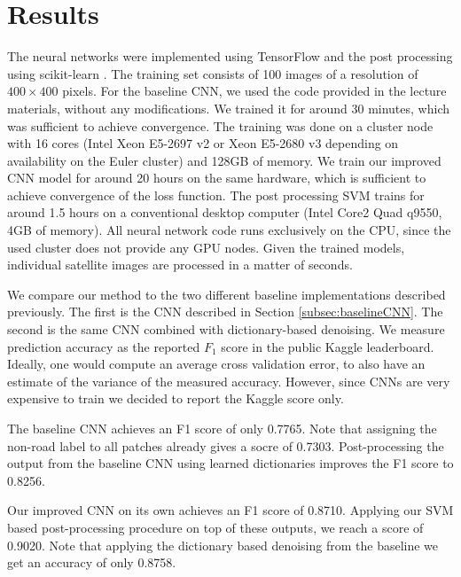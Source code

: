 \documentclass[10pt,conference,compsocconf]{IEEEtran}
\begin{document}
\section{Results}
\label{sec:results}
The neural networks were implemented using TensorFlow \cite{tensorflow.2015} and the post processing using scikit-learn \cite{sklearn.2011}. The training set consists of 100 images of a resolution of $ 400 \times 400 $ pixels. For the baseline CNN, we used the code provided in the lecture materials, without any modifications. We trained it for around 30 minutes, which was sufficient to achieve convergence. The training was done on a cluster node with 16 cores (Intel Xeon E5-2697 v2 or Xeon E5-2680 v3 depending on availability on the Euler cluster) and 128GB of memory. We train our improved CNN model for around 20 hours on the same hardware, which is sufficient to achieve convergence of the loss function. The post processing SVM trains for around 1.5 hours on a conventional desktop computer (Intel Core2 Quad q9550, 4GB of memory). All neural network code runs exclusively on the CPU, since the used cluster does not provide any GPU nodes. Given the trained models, individual satellite images are processed in a matter of seconds.

\par 
We compare our method to the two different baseline implementations described previously. The first is the CNN described in Section \ref{subsec:baselineCNN}. The second is the same CNN combined with dictionary-based denoising. We measure prediction accuracy as the reported $ F_1 $ score in the public Kaggle leaderboard. Ideally, one would compute an average cross validation error, to also have an estimate of the variance of the measured accuracy. However, since CNNs are very expensive to train we decided to report the Kaggle score only.

\par
The baseline CNN achieves an F1 score of only 0.7765. Note that assigning the non-road label to all patches already gives a socre of 0.7303. Post-processing the output from the baseline CNN using learned dictionaries improves the F1 score to 0.8256. 

\par
Our improved CNN on its own achieves an F1 score of 0.8710. Applying our SVM based post-processing procedure on top of these outputs, we reach a score of 0.9020. Note that applying the dictionary based denoising from the baseline we get an accuracy of only 0.8758.
\end{document}
